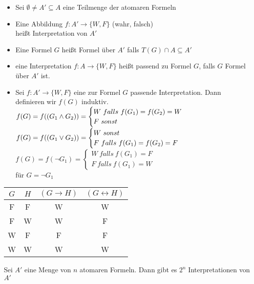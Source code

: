 \vspace{1cm}
\begin{itemize}
\item Sei $\emptyset \neq A' \subseteq A$ eine Teilmenge der atomaren Formeln
\item Eine Abbildung $f: A' \rightarrow \{W,F\}$ \hspace{1cm} (wahr, falsch)\\
    heißt Interpretation von $A'$
\item Eine Formel $G$ heißt Formel über $A'$ falls $T(G) \cap A \subseteq A'$
\item eine Interpretation $f: A \rightarrow \{W, F\}$ heißt passend zu Formel $G$, falls $G$ Formel über $A'$ ist.
\item Sei $f: A' \rightarrow \{W, F\}$ eine zur Formel $G$ passende Interpretation. Dann definieren wir $f(G)$ induktiv.\\
    $f(G) = f(( G_1 \AND G_2 )) = \begin{cases} W\ falls\ f(G_1) = f(G_2) = W \\ F\ sonst\end{cases}$\\
    $f(G) = f((G_1 \OR G_2)) = \begin{cases} W\ sonst \\ F\ falls\ f(G_1)=f(G_2)=F \end{cases}$\\
    $f(G) = f(\neg G_1) = \begin{cases} W\ falls\ f(G_1)=F \\ F\ falls\ f(G_1)=W \end{cases}$\\
    für $G=\neg G_1$
\end{itemize}


\begin{tabular}{c|c|c|c}
$G$ & $H$ & $(G \rightarrow H)$ & $(G \leftrightarrow H)$\\
\hline
F & F & W & W\\
F & W & W & F\\
W & F & F & F\\
W & W & W & W\\
\end{tabular}

Sei $A'$ eine Menge von $n$ atomaren Formeln. Dann gibt es $2^n$ Interpretationen von $A'$\\

